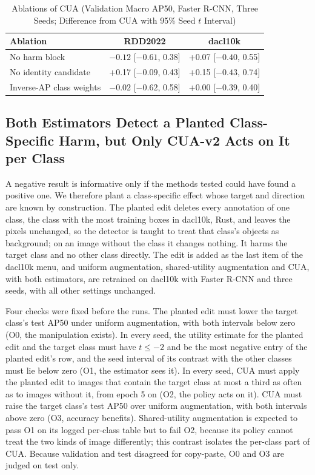 \documentclass[conference]{IEEEtran}
\begin{document}
\begin{table}[t]
\caption{Ablations of CUA (Validation Macro AP50, Faster R-CNN, Three Seeds; Difference from CUA with 95\% Seed $t$ Interval)}
\label{tab:ablations}
\centering
\footnotesize
\setlength{\tabcolsep}{3pt}
\begin{tabular}{@{}lcc@{}}
\toprule
\textbf{Ablation} & \textbf{RDD2022} & \textbf{dacl10k} \\
\midrule
No harm block & $-0.12$ [$-0.61$, 0.38] & +0.07 [$-0.40$, 0.55] \\
No identity candidate & +0.17 [$-0.09$, 0.43] & +0.15 [$-0.43$, 0.74] \\
Inverse-AP class weights & $-0.02$ [$-0.62$, 0.58] & +0.00 [$-0.39$, 0.40] \\
\bottomrule
\end{tabular}
\end{table}

\subsection{Both Estimators Detect a Planted Class-Specific Harm, but Only CUA-v2 Acts on It per Class}
\label{sec:results_control}

A negative result is informative only if the methods tested could have found a positive one. We therefore plant a class-specific effect whose target and direction are known by construction. The planted edit deletes every annotation of one class, the class with the most training boxes in dacl10k, Rust, and leaves the pixels unchanged, so the detector is taught to treat that class's objects as background; on an image without the class it changes nothing. It harms the target class and no other class directly. The edit is added as the last item of the dacl10k menu, and uniform augmentation, shared-utility augmentation and CUA, with both estimators, are retrained on dacl10k with Faster R-CNN and three seeds, with all other settings unchanged.

Four checks were fixed before the runs. The planted edit must lower the target class's test AP50 under uniform augmentation, with both intervals below zero (O0, the manipulation exists). In every seed, the utility estimate for the planted edit and the target class must have $t\leq-2$ and be the most negative entry of the planted edit's row, and the seed interval of its contrast with the other classes must lie below zero (O1, the estimator sees it). In every seed, CUA must apply the planted edit to images that contain the target class at most a third as often as to images without it, from epoch 5 on (O2, the policy acts on it). CUA must raise the target class's test AP50 over uniform augmentation, with both intervals above zero (O3, accuracy benefits). Shared-utility augmentation is expected to pass O1 on its logged per-class table but to fail O2, because its policy cannot treat the two kinds of image differently; this contrast isolates the per-class part of CUA. Because validation and test disagreed for copy-paste, O0 and O3 are judged on test only.
\end{document}
